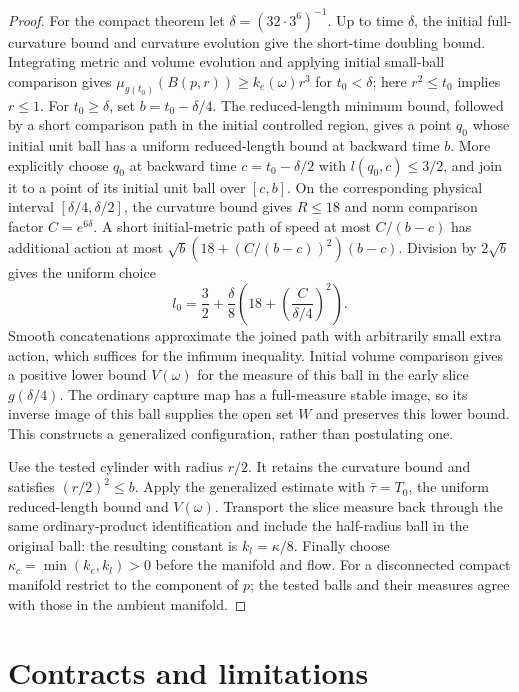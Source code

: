 \begin{proof}
For the compact theorem let $\delta=(32\cdot3^6)^{-1}$.
Up to time $\delta$, the initial full-curvature bound and curvature evolution
give the short-time doubling bound.  Integrating metric and volume evolution
and applying initial small-ball comparison gives
$\mu_{g(t_0)}(B(p,r))\geq k_e(\omega)r^3$ for $t_0<\delta$;
here $r^2\leq t_0$ implies $r\leq1$.
For $t_0\geq\delta$, set $b=t_0-\delta/4$.
The reduced-length minimum bound, followed by a short comparison path in
the initial controlled region, gives a point $q_0$ whose initial unit ball
has a uniform reduced-length bound at backward time $b$.
More explicitly choose $q_0$ at backward time $c=t_0-\delta/2$ with
$l(q_0,c)\leq3/2$, and join it to a point of its initial unit ball over
$[c,b]$.  On the corresponding physical interval $[\delta/4,\delta/2]$,
the curvature bound gives $R\leq18$ and norm comparison factor
$C=e^{6\delta}$.  A short initial-metric path of speed at most
$C/(b-c)$ has additional action at most
$\sqrt b(18+(C/(b-c))^2)(b-c)$.  Division by $2\sqrt b$ gives the
uniform choice
\[
 l_0=\frac32+\frac{\delta}{8}
              \left(18+\left(\frac{C}{\delta/4}\right)^2\right).
\]
Smooth concatenations approximate the joined path with arbitrarily small
extra action, which suffices for the infimum inequality.
Initial volume comparison gives a positive lower bound $V(\omega)$ for
the measure of this ball in the early slice $g(\delta/4)$.
The ordinary capture map has a full-measure stable image, so its inverse
image of this ball supplies the open set $W$ and preserves this lower bound.
This constructs a generalized configuration, rather than postulating one.

Use the tested cylinder with radius $r/2$.  It retains the curvature bound
and satisfies $(r/2)^2\leq b$.  Apply the generalized estimate with
$\bar\tau=T_0$, the uniform reduced-length bound and $V(\omega)$.
Transport the slice measure back through the same ordinary-product
identification and include the half-radius ball in the original ball:
the resulting constant is $k_l=\kappa/8$.
Finally choose $\kappa_c=\min(k_e,k_l)>0$ before the manifold and flow.
For a disconnected compact manifold restrict to the component of $p$;
the tested balls and their measures agree with those in the ambient manifold.
\end{proof}

\section{Contracts and limitations}


